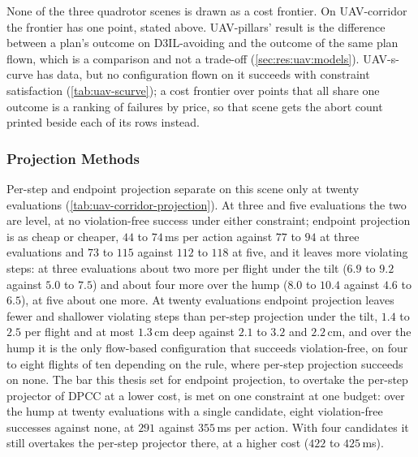 None of the three quadrotor scenes is drawn as a cost frontier. On UAV-corridor the frontier has one
point, stated above.
UAV-pillars' result is the difference between a plan's outcome on D3IL-avoiding and the outcome of the
same plan flown, which is a comparison and not a trade-off (\autoref{sec:res:uav:models}). UAV-s-curve
has data, but no configuration flown on it succeeds with constraint satisfaction
(\autoref{tab:uav-scurve}); a cost frontier over points that all share one outcome is a ranking of
failures by price, so that scene gets the abort count printed beside each of its rows instead.

\FloatBarrier
\subsubsection{Projection Methods}\label{sec:res:uav:projection}
Per-step and endpoint projection separate on this scene only at twenty evaluations
(\autoref{tab:uav-corridor-projection}). At three and five evaluations the two are level, at no
violation-free success under either constraint; endpoint projection is as cheap or cheaper, $44$ to
$74$\,ms per action against $77$ to $94$ at three evaluations and $73$ to $115$ against $112$ to $118$ at
five, and it leaves more violating steps: at three evaluations about two more per flight under the tilt
($6.9$ to $9.2$ against $5.0$ to $7.5$) and about four more over the hump ($8.0$ to $10.4$ against $4.6$
to $6.5$), at five about one more. At twenty evaluations endpoint projection leaves fewer and shallower
violating steps than per-step projection under the tilt, $1.4$ to $2.5$ per flight and at most
$1.3$\,cm deep against $2.1$ to $3.2$ and $2.2$\,cm, and
over the hump it is the only flow-based configuration that succeeds violation-free, on four to eight
flights of ten depending on the rule, where per-step projection succeeds on none. The bar this thesis set
for endpoint projection, to overtake the per-step projector of \ac{DPCC} at a lower cost, is met on one
constraint at one budget: over the hump at twenty evaluations with a single candidate, eight
violation-free successes against none, at $291$ against $355$\,ms per action. With four candidates it
still overtakes the per-step projector there, at a higher cost ($422$ to $425$\,ms).

